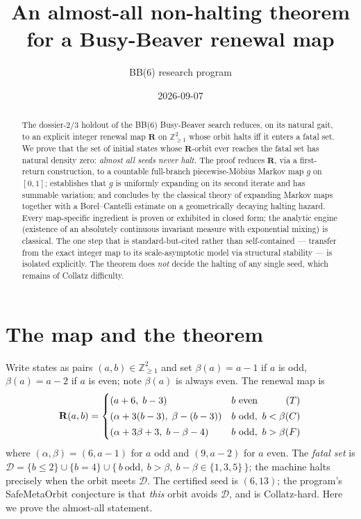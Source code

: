 \documentclass[11pt]{article}
\title{\bfseries An almost-all non-halting theorem for a Busy-Beaver renewal map}
\author{BB(6) research program}
\date{2026-09-07}
\theoremstyle{definition}\newtheorem{definition}{Definition}
\theoremstyle{remark}\newtheorem{remark}{Remark}
\newcommand{\R}{\mathbf{R}}\newcommand{\Z}{\mathbb{Z}}\newcommand{\HH}{\mathbb{H}}
\begin{document}
\maketitle

\begin{abstract}
The dossier-2/3 holdout of the BB(6) Busy-Beaver search reduces, on its
natural gait, to an explicit integer renewal map $\R$ on $\Z_{\ge1}^2$
whose orbit halts iff it enters a fatal set. We prove that the set of
initial states whose $\R$-orbit ever reaches the fatal set has natural
density zero: \emph{almost all seeds never halt.} The proof reduces $\R$,
via a first-return construction, to a countable full-branch
piecewise-M\"obius Markov map $g$ on $[0,1]$; establishes that $g$ is
uniformly expanding on its second iterate and has summable variation; and
concludes by the classical theory of expanding Markov maps together with a
Borel--Cantelli estimate on a geometrically decaying halting hazard. Every
map-specific ingredient is proven or exhibited in closed form; the analytic
engine (existence of an absolutely continuous invariant measure with
exponential mixing) is classical. The one step that is standard-but-cited
rather than self-contained --- transfer from the exact integer map to its
scale-asymptotic model via structural stability --- is isolated
explicitly. The theorem does \emph{not} decide the halting of any single
seed, which remains of Collatz difficulty.
\end{abstract}

\section{The map and the theorem}
Write states as pairs $(a,b)\in\Z_{\ge1}^2$ and set
$\beta(a)=a-1$ if $a$ is odd, $\beta(a)=a-2$ if $a$ is even; note
$\beta(a)$ is always even. The renewal map is
\[
\R(a,b)=\begin{cases}
(a+6,\;b-3) & b\ \text{even} \hfill (T)\\[2pt]
(\alpha+3(b-3),\;\beta-(b-3)) & b\ \text{odd},\ b<\beta \hfill (C)\\[2pt]
(\alpha+3\beta+3,\;b-\beta-4) & b\ \text{odd},\ b>\beta \hfill (F)
\end{cases}
\]
where $(\alpha,\beta)=(6,a-1)$ for $a$ odd and $(9,a-2)$ for $a$ even.
The \emph{fatal set} is
$\mathcal D=\{b\le2\}\cup\{b=4\}\cup\{\,b\ \text{odd},\ b>\beta,\ b-\beta\in\{1,3,5\}\,\}$;
the machine halts precisely when the orbit meets $\mathcal D$. The
certified seed is $(6,13)$; the program's SafeMetaOrbit conjecture is that
\emph{this} orbit avoids $\mathcal D$, and is Collatz-hard. Here we prove
the almost-all statement.
\end{document}
